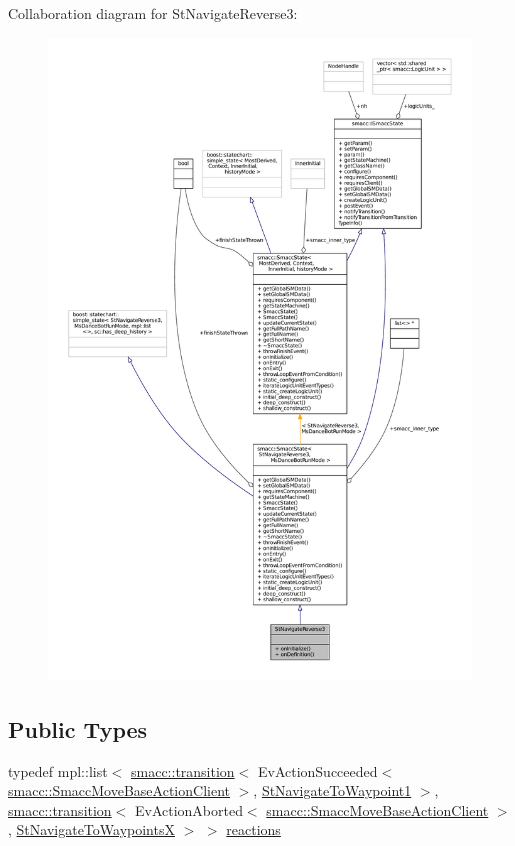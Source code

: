 Collaboration diagram for St\+Navigate\+Reverse3\+:
\nopagebreak
\begin{figure}[H]
\begin{center}
\leavevmode
\includegraphics[width=350pt]{structStNavigateReverse3__coll__graph}
\end{center}
\end{figure}
\subsection*{Public Types}
\begin{DoxyCompactItemize}
\item 
typedef mpl\+::list$<$ \hyperlink{classsmacc_1_1transition}{smacc\+::transition}$<$ Ev\+Action\+Succeeded$<$ \hyperlink{classsmacc_1_1SmaccMoveBaseActionClient}{smacc\+::\+Smacc\+Move\+Base\+Action\+Client} $>$, \hyperlink{structStNavigateToWaypoint1}{St\+Navigate\+To\+Waypoint1} $>$, \hyperlink{classsmacc_1_1transition}{smacc\+::transition}$<$ Ev\+Action\+Aborted$<$ \hyperlink{classsmacc_1_1SmaccMoveBaseActionClient}{smacc\+::\+Smacc\+Move\+Base\+Action\+Client} $>$, \hyperlink{structStNavigateToWaypointsX}{St\+Navigate\+To\+WaypointsX} $>$ $>$ \hyperlink{structStNavigateReverse3_acf0fcf288b4fe012f17503c309c54caf}{reactions}
\end{DoxyCompactItemize}
